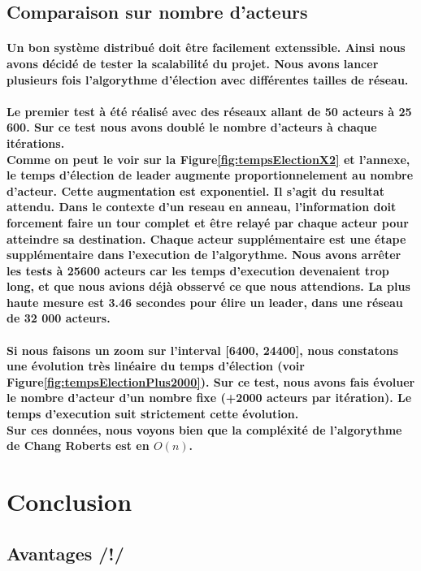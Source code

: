 \documentclass[12pt]{article}
\begin{document}
\subsection{Comparaison sur nombre d'acteurs}
\paragraph{Un bon système distribué doit être facilement extenssible. Ainsi nous avons décidé de tester la scalabilité du projet. Nous avons lancer plusieurs fois l'algorythme d'élection avec différentes tailles de réseau.}
\paragraph{Le premier test à été réalisé avec des réseaux allant de 50 acteurs à 25 600. Sur ce test nous avons doublé le nombre d'acteurs à chaque itérations.\\
Comme on peut le voir sur la Figure\ref{fig:tempsElectionX2} et l'annexe, le temps d'élection de leader augmente proportionnelement au nombre d'acteur. Cette augmentation est exponentiel. Il s'agit du resultat attendu. Dans le contexte d'un reseau en anneau, l'information doit forcement faire un tour complet et être relayé par chaque acteur pour atteindre sa destination. Chaque acteur supplémentaire est une étape supplémentaire dans l'execution de l'algorythme. Nous avons arrêter les tests à 25600 acteurs car les temps d'execution devenaient trop long, et que nous avions déjà obsservé ce que nous attendions. La plus haute mesure est 3.46 secondes pour élire un leader, dans une réseau de 32 000 acteurs.
}
\paragraph{Si nous faisons un zoom sur l'interval [6400, 24400], nous constatons une évolution très linéaire du temps d'élection (voir Figure\ref{fig:tempsElectionPlus2000}). Sur ce test, nous avons fais évoluer le nombre d'acteur d'un nombre fixe (+2000 acteurs par itération). Le temps d'execution suit strictement cette évolution.\\
Sur ces données, nous voyons bien que la compléxité de l'algorythme de Chang Roberts est en $O(n)$.}
\section{Conclusion}
\subsection{Avantages /!/}
\end{document}
